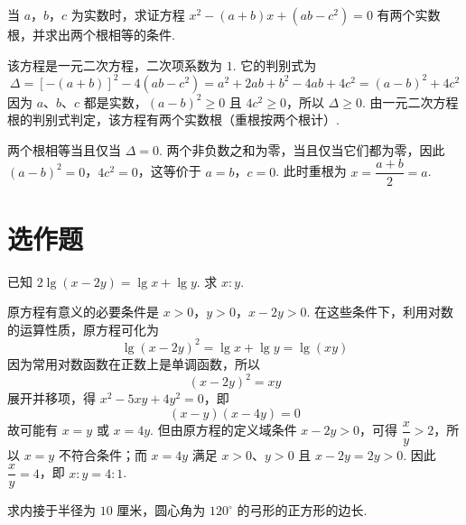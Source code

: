 \begin{problem}
当 \(a\)，\(b\)，\(c\) 为实数时，求证方程 \(x^2-(a+b)x+(ab-c^2)=0\) 有两个实数根，并求出两个根相等的条件.
\end{problem}

\begin{solution}
该方程是一元二次方程，二次项系数为 \(1\). 它的判别式为
\[
\Delta=\left[-(a+b)\right]^2-4\left(ab-c^2\right)=a^2+2ab+b^2-4ab+4c^2=(a-b)^2+4c^2
\]
因为 \(a\)、\(b\)、\(c\) 都是实数，\((a-b)^2\geqslant0\) 且 \(4c^2\geqslant0\)，所以 \(\Delta\geqslant0\). 由一元二次方程根的判别式判定，该方程有两个实数根（重根按两个根计）.

两个根相等当且仅当 \(\Delta=0\). 两个非负数之和为零，当且仅当它们都为零，因此 \((a-b)^2=0\)，\(4c^2=0\)，这等价于 \(a=b\)，\(c=0\). 此时重根为 \(x=\dfrac{a+b}{2}=a\).
\end{solution}

\section{选作题}

\begin{problem}
已知 \(2\lg(x-2y)=\lg x+\lg y\). 求 \(x:y\).
\end{problem}

\begin{solution}
原方程有意义的必要条件是 \(x>0\)，\(y>0\)，\(x-2y>0\). 在这些条件下，利用对数的运算性质，原方程可化为
\[
\lg\left(x-2y\right)^2=\lg x+\lg y=\lg(xy)
\]
因为常用对数函数在正数上是单调函数，所以
\[
\left(x-2y\right)^2=xy
\]
展开并移项，得 \(x^2-5xy+4y^2=0\)，即
\[
(x-y)(x-4y)=0
\]
故可能有 \(x=y\) 或 \(x=4y\). 但由原方程的定义域条件 \(x-2y>0\)，可得 \(\dfrac{x}{y}>2\)，所以 \(x=y\) 不符合条件；而 \(x=4y\) 满足 \(x>0\)、\(y>0\) 且 \(x-2y=2y>0\). 因此 \(\dfrac{x}{y}=4\)，即 \(x:y=4:1\).
\end{solution}

\begin{problem}
求内接于半径为 \(10\text{ 厘米}\)，圆心角为 \(120^\circ\) 的弓形的正方形的边长.

\end{problem}


